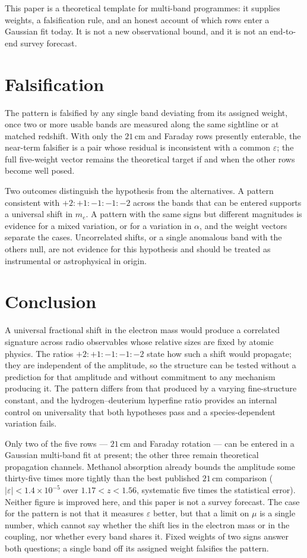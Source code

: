 \documentclass[aps,prd,twocolumn,superscriptaddress,nofootinbib,10pt]{revtex4-2}
\begin{document}
This paper is a theoretical template for multi-band programmes: it supplies weights, a falsification
rule, and an honest account of which rows enter a Gaussian fit today. It is not a new observational
bound, and it is not an end-to-end survey forecast.

\section{Falsification}

The pattern is falsified by any single band deviating from its assigned weight, once two or more
usable bands are measured along the same sightline or at matched redshift. With only the $21\,$cm
and Faraday rows presently enterable, the near-term falsifier is a pair whose residual is
inconsistent with a common $\varepsilon$; the full five-weight vector remains the theoretical
target if and when the other rows become well posed.

Two outcomes distinguish the hypothesis from the alternatives. A pattern consistent with
$+2:+1:-1:-1:-2$ across the bands that can be entered supports a universal shift in $m_e$. A
pattern with the same signs but different magnitudes is evidence for a mixed variation, or for a
variation in $\alpha$, and the weight vectors separate the cases. Uncorrelated shifts, or a single
anomalous band with the others null, are not evidence for this hypothesis and should be treated as
instrumental or astrophysical in origin.

\section{Conclusion}

A universal fractional shift in the electron mass would produce a correlated signature across radio
observables whose relative sizes are fixed by atomic physics. The ratios
$+2:+1:-1:-1:-2$ state how such a shift would propagate; they are independent of the amplitude, so
the structure can be tested without a prediction for that amplitude and without commitment to any
mechanism producing it. The pattern differs from that produced by a varying fine-structure
constant, and the hydrogen--deuterium hyperfine ratio provides an internal control on universality
that both hypotheses pass and a species-dependent variation fails.

Only two of the five rows --- $21\,$cm and Faraday rotation --- can be entered in a Gaussian
multi-band fit at present; the other three remain theoretical propagation channels. Methanol
absorption already bounds the amplitude some thirty-five times more tightly than the best published
$21\,$cm comparison ($|\varepsilon| < 1.4 \times 10^{-5}$ over $1.17 < z < 1.56$, systematic five
times the statistical error). Neither figure is improved here, and this paper is not a survey
forecast. The case for the pattern is not that it measures $\varepsilon$ better, but that a limit
on $\mu$ is a single number, which cannot say whether the shift lies in the electron mass or in the
coupling, nor whether every band shares it. Fixed weights of two signs answer both questions; a
single band off its assigned weight falsifies the pattern.



\end{document}
